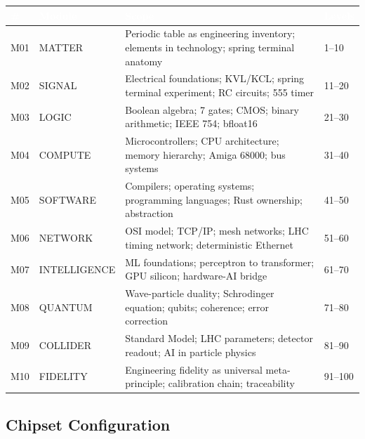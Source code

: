\documentclass[11pt,letterpaper]{article}
\newcommand{\tableheader}[1]{\textbf{\sffamily\textcolor{white}{#1}}}
\begin{document}
\begin{center}
\begin{tabularx}{\textwidth}{C{0.6cm}L{2.4cm}XC{1.8cm}}
\toprule
{}
\tableheader{\#} & \tableheader{Module} & \tableheader{Scope} & \tableheader{Levels} \\
\midrule
M01 & MATTER & Periodic table as engineering inventory; elements in technology; spring terminal anatomy & 1--10 \\
M02 & SIGNAL & Electrical foundations; KVL/KCL; spring terminal experiment; RC circuits; 555 timer & 11--20 \\
M03 & LOGIC & Boolean algebra; 7 gates; CMOS; binary arithmetic; IEEE 754; bfloat16 & 21--30 \\
M04 & COMPUTE & Microcontrollers; CPU architecture; memory hierarchy; Amiga 68000; bus systems & 31--40 \\
M05 & SOFTWARE & Compilers; operating systems; programming languages; Rust ownership; abstraction & 41--50 \\
M06 & NETWORK & OSI model; TCP/IP; mesh networks; LHC timing network; deterministic Ethernet & 51--60 \\
M07 & INTELLIGENCE & ML foundations; perceptron to transformer; GPU silicon; hardware-AI bridge & 61--70 \\
M08 & QUANTUM & Wave-particle duality; Schrodinger equation; qubits; coherence; error correction & 71--80 \\
M09 & COLLIDER & Standard Model; LHC parameters; detector readout; AI in particle physics & 81--90 \\
M10 & FIDELITY & Engineering fidelity as universal meta-principle; calibration chain; traceability & 91--100 \\
\bottomrule
\end{tabularx}
\end{center}

\subsection{Chipset Configuration}
\end{document}
